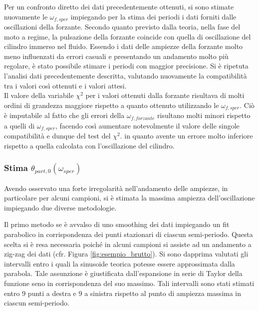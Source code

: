 \documentclass[a4paper,11pt,oneside]{article}
\begin{document}
Per un confronto diretto dei dati precedentemente ottenuti, si sono stimate nuovamente le $\omega_{f, sper}$ impiegando per la stima dei periodi i dati forniti dalle oscillazioni della forzante. Secondo quanto previsto dalla teoria, nella fase del moto a regime, la pulsazione della forzante coincide con quella di oscillazione del cilindro immerso nel fluido. Essendo i dati delle ampiezze della forzante molto meno influenzati da errori casuali e presentando un andamento molto più regolare, è stato possibile stimare i periodi con maggior precisione. Si è ripetuta l'analisi dati precedentemente descritta, valutando nuovamente la compatibilità tra i valori così ottenuti e i valori attesi.\\
Il valore della variabile $\chi^{2}$ per i valori ottenuti dalla forzante risultava di molti ordini di grandezza maggiore rispetto a quanto ottenuto utilizzando le $\omega_{f, sper}$. Ciò è imputabile al fatto che gli errori della  $\omega_{f, forzante}$ risultano molti minori rispetto a quelli di $\omega_{f, sper}$, facendo così aumentare notevolmente il valore delle singole compatibilità e dunque del test del $\chi^2$. in quanto avente un errore molto inferiore rispetto a quella calcolata con l'oscillazione del cilindro.



\subsubsection{Stima $\theta_{part, 0}(\omega_{sper})$}
Avendo osservato una forte irregolarità nell'andamento delle ampiezze, in particolare per alcuni campioni, si è stimata la massima ampiezza dell'oscillazione impiegando due diverse metodologie. 

Il primo metodo se è avvalso di uno smoothing dei dati impiegando un fit parabolico in corrispondenza dei punti stazionari di ciascun semi-periodo. Questa scelta si è resa necessaria poiché in alcuni campioni si assiste ad un andamento a zig-zag dei dati (cfr. Figura \ref{fig:esempio_brutto}). Si sono dapprima valutati gli intervalli entro i quali la sinusoide teorica potesse essere approssimata dalla parabola. Tale assunzione è giustificata dall'espansione in serie di Taylor della funzione seno in corrispondenza del suo massimo.
Tali intervalli sono stati stimati entro 9 punti a destra e 9 a sinistra rispetto al punto di ampiezza massima in ciascun semi-periodo. 
\end{document}
